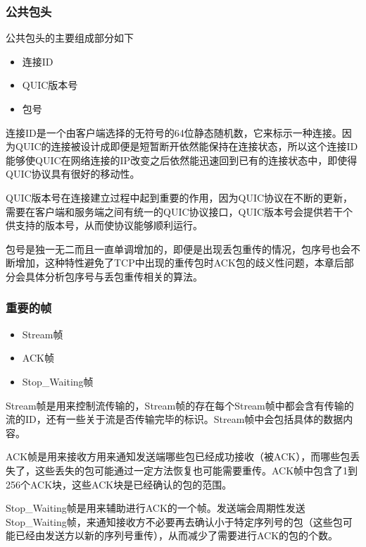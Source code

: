 \subsubsection{公共包头}
公共包头的主要组成部分如下
\begin{itemize}
  \item 连接ID
  \item QUIC版本号
  \item 包号
\end{itemize}
连接ID是一个由客户端选择的无符号的64位静态随机数，它来标示一种连接。因为QUIC的连接被设计成即便是短暂断开依然能保持在连接状态，所以这个连接ID能够使QUIC在网络连接的IP改变之后依然能迅速回到已有的连接状态中，即使得QUIC协议具有很好的移动性。

QUIC版本号在连接建立过程中起到重要的作用，因为QUIC协议在不断的更新，需要在客户端和服务端之间有统一的QUIC协议接口，QUIC版本号会提供若干个供支持的版本号，从而使协议能够顺利运行。

包号是独一无二而且一直单调增加的，即便是出现丢包重传的情况，包序号也会不断增加，这种特性避免了TCP中出现的重传包时ACK包的歧义性问题，本章后部分会具体分析包序号与丢包重传相关的算法。
\subsubsection{重要的帧}
\begin{itemize}
  \item Stream帧
  \item ACK帧
  \item Stop\_Waiting帧
\end{itemize}
Stream帧是用来控制流传输的，Stream帧的存在每个Stream帧中都会含有传输的流的ID，还有一些关于流是否传输完毕的标识。Stream帧中会包括具体的数据内容。

ACK帧是用来接收方用来通知发送端哪些包已经成功接收（被ACK），而哪些包丢失了，这些丢失的包可能通过一定方法恢复也可能需要重传。ACK帧中包含了1到256个ACK块，这些ACK块是已经确认的包的范围。

Stop\_Waiting帧是用来辅助进行ACK的一个帧。发送端会周期性发送Stop\_Waiting帧，来通知接收方不必要再去确认小于特定序列号的包（这些包可能已经由发送方以新的序列号重传），从而减少了需要进行ACK的包的个数。

